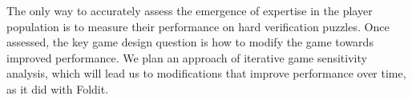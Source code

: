 \documentclass{sig-alternate}
\begin{document}
The only way to accurately assess the emergence of expertise in the
player population is to measure their performance on hard verification
puzzles.  Once assessed, the key game design question is how to modify
the game towards improved performance.  We plan an approach of iterative
game sensitivity analysis, which will lead us to modifications that improve
performance over time, as it did with Foldit.
 
 
% 
% 
% 
\end{document}
